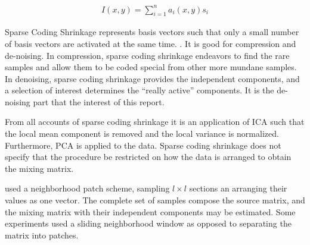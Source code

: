 \documentclass[12pt ]{article}
\begin{document}
\begin{eqnarray}
I(x,y) = \sum _{i =1 }^n  a_i (x,y) s_i \label{image_character}%
\end{eqnarray}


Sparse Coding Shrinkage represents basis vectors such that only a small number of basis vectors are activated at the same time.  \cite[397]{appo-ica-book}.  It is good for compression and de-noising.   In compression, sparse coding shrinkage endeavors to find the rare samples and allow them to be coded special from other more mundane samples.   In denoising, sparse coding shrinkage provides the independent components, and a selection of interest determines the ``really active'' components.  It is the de-noising part that the interest of this report. 

From all accounts of sparse coding shrinkage it is an application of ICA such that the local mean component is removed and the local variance is normalized.    Furthermore, PCA is applied to the data.   Sparse coding shrinkage does not specify that the procedure be restricted on how the data is arranged to obtain the mixing matrix.  

\cite[391-400]{appo-ica-book} used a neighborhood patch scheme, sampling $l \times l$ sections an arranging their values as one vector.  The complete set of samples compose the source matrix, and the mixing matrix with their independent components may be estimated.  Some experiments used a sliding neighborhood window as opposed to separating the matrix into patches. 


\end{document}
